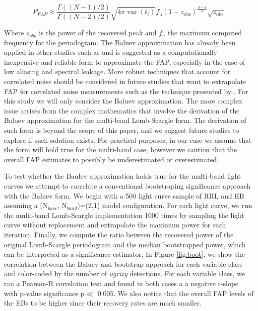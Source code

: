 \documentclass[DM,authoryear,toc]{lsstdoc}
\begin{document}
\begin{equation}
P_{FAP} \approx \frac{\Gamma((N-1) / 2)}{\Gamma((N-2) / 2)} \sqrt{4 \pi \operatorname{var}\left(t_i\right)} f_{\mathrm{u}}\left(1-z_{\mathrm{obs}}\right)^{\frac{N-4}{2}} \sqrt{z_{\mathrm{obs}}}
\end{equation}

Where $z_{obs}$ is the power of the recovered peak and $f_u$ the maximum computed frequency for the periodogram.
The Baluev approximation has already been applied in other studies such as \citet{Suveges:Suveges15} and is suggested as a computationally inexpensive and reliable form to approximate the FAP, especially in the case of low aliasing and spectral leakage. More robust techniques that account for correlated noise should be considered in future studies that want to extrapolate FAP for correlated noise measurements such as the technique presented by \cite{2020A&A...635A..83D}. For this study we will only consider the Baluev approximation.  
The more complex issue arrises from the complex mathematics that involve the derivation of the Baluev approximation for the multi-band Lomb-Scargle form.
The derivation of such form is beyond the scope of this paper, and we suggest future studies to explore if such solution exists.
For practical purposes, in our case we assume that the \citet{Baluev:Baluev2008}  form will hold true for the multi-band case, however we caution that the overall FAP estimates to possibly be underestimated or overestimated.

To test whether the Baulev approximation holds true for the multi-band light curves we attempt to correlate a conventional bootstraping significance approach with the Baluev form.
We begin with a 500 light curve sample of RRL and EB assuming a (N$_{base}$, N$_{band}$)=(2,1) model configuration.
For each light curve, we run the multi-band Lomb-Scargle implementation 1000 times by sampling the light curve without replacement and extrapolate the maximum power for each iteration.
Finally, we compute the ratio between the recovered power of the original Lomb-Scargle periodogram and the median bootstrapped power, which can be interpreted as a significance estimator.
In Figure \ref{fig:boot}, we show the correlation between the Baluev and bootstrap approach for each variable class and color-coded by the number of \textit{ugrizy} detections.
For each variable class, we ran a Pearson-R correlation test and found in both cases a a negative r-slope with p-value significance p$\ll$ 0.005.
We also notice that the overall FAP levels of the EBs to be higher since their recovery rates are much smaller.
\end{document}
